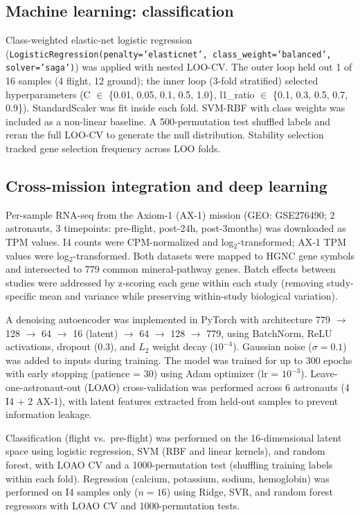 \documentclass[11pt,a4paper]{article}
\begin{document}
\subsection{Machine learning: classification}

Class-weighted elastic-net logistic regression (\texttt{LogisticRegression(penalty='elasticnet', class\_weight='balanced', solver='saga')}) was applied with nested LOO-CV. The outer loop held out 1 of 16 samples (4 flight, 12 ground); the inner loop (3-fold stratified) selected hyperparameters (C $\in$ \{0.01, 0.05, 0.1, 0.5, 1.0\}, l1\_ratio $\in$ \{0.1, 0.3, 0.5, 0.7, 0.9\}). StandardScaler was fit inside each fold. SVM-RBF with class weights was included as a non-linear baseline. A 500-permutation test shuffled labels and reran the full LOO-CV to generate the null distribution. Stability selection tracked gene selection frequency across LOO folds.

\subsection{Cross-mission integration and deep learning}

Per-sample RNA-seq from the Axiom-1 (AX-1) mission (GEO: GSE276490; 2 astronauts, 3 timepoints: pre-flight, post-24h, post-3months) was downloaded as TPM values. I4 counts were CPM-normalized and log$_2$-transformed; AX-1 TPM values were log$_2$-transformed. Both datasets were mapped to HGNC gene symbols and intersected to 779 common mineral-pathway genes. Batch effects between studies were addressed by z-scoring each gene within each study (removing study-specific mean and variance while preserving within-study biological variation).

A denoising autoencoder was implemented in PyTorch with architecture 779 $\to$ 128 $\to$ 64 $\to$ 16 (latent) $\to$ 64 $\to$ 128 $\to$ 779, using BatchNorm, ReLU activations, dropout (0.3), and $L_2$ weight decay ($10^{-4}$). Gaussian noise ($\sigma = 0.1$) was added to inputs during training. The model was trained for up to 300 epochs with early stopping (patience = 30) using Adam optimizer (lr = $10^{-3}$). Leave-one-astronaut-out (LOAO) cross-validation was performed across 6 astronauts (4 I4 + 2 AX-1), with latent features extracted from held-out samples to prevent information leakage.

Classification (flight vs.\ pre-flight) was performed on the 16-dimensional latent space using logistic regression, SVM (RBF and linear kernels), and random forest, with LOAO CV and a 1000-permutation test (shuffling training labels within each fold). Regression (calcium, potassium, sodium, hemoglobin) was performed on I4 samples only ($n = 16$) using Ridge, SVR, and random forest regressors with LOAO CV and 1000-permutation tests.
\end{document}
